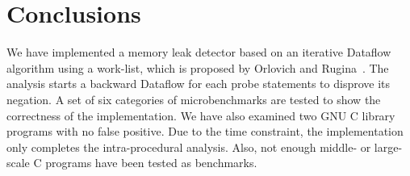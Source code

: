 \section{Conclusions}

We have implemented a memory leak detector based on an iterative Dataflow 
algorithm using 
a work-list, which is proposed by Orlovich and Rugina~\cite{rugina}. The analysis 
starts a backward Dataflow for each probe statements to disprove its negation. 
A set of six categories of microbenchmarks are tested to show the correctness 
of the implementation. We have also examined two GNU C library programs with no 
false positive. Due to the time constraint, the implementation only completes 
the intra-procedural analysis. Also, not enough middle- or large-scale C 
programs have been tested as benchmarks.
